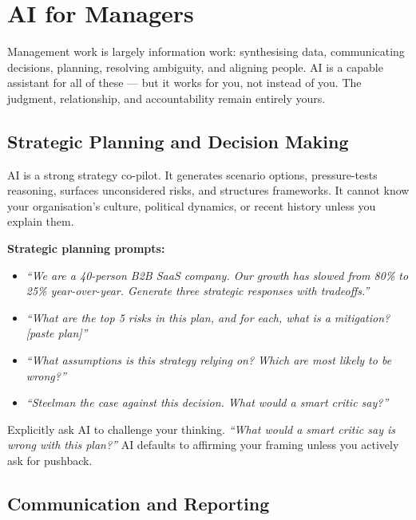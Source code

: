 \chapter{AI for Managers}
\label{ch:managers}

Management work is largely information work: synthesising data, communicating decisions,
planning, resolving ambiguity, and aligning people.
AI is a capable assistant for all of these --- but it works for you, not instead of you.
The judgment, relationship, and accountability remain entirely yours.

\section{Strategic Planning and Decision Making}
\label{sec:strategy}

AI is a strong strategy co-pilot.
It generates scenario options, pressure-tests reasoning, surfaces unconsidered risks,
and structures frameworks.
It cannot know your organisation's culture, political dynamics, or recent history unless
you explain them.

\textbf{Strategic planning prompts:}
\begin{itemize}
  \item \textit{``We are a 40-person B2B SaaS company. Our growth has slowed from 80\% to 25\% year-over-year. Generate three strategic responses with tradeoffs.''}
  \item \textit{``What are the top 5 risks in this plan, and for each, what is a mitigation? [paste plan]''}
  \item \textit{``What assumptions is this strategy relying on? Which are most likely to be wrong?''}
  \item \textit{``Steelman the case against this decision. What would a smart critic say?''}
\end{itemize}

\begin{tipbox}
Explicitly ask AI to challenge your thinking.
\textit{``What would a smart critic say is wrong with this plan?''}
AI defaults to affirming your framing unless you actively ask for pushback.
\end{tipbox}

\section{Communication and Reporting}
\label{sec:communication}

